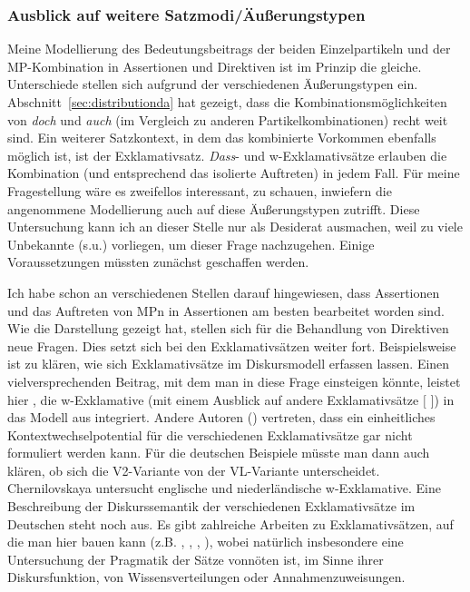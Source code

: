 {\subsubsection{Ausblick auf weitere Satzmodi/Äußerungstypen}
Meine Modellierung des Bedeutungsbeitrags der beiden Einzelpartikeln und der MP-Kombination in Assertionen  und Direktiven  ist im Prinzip die gleiche. Unterschiede stellen sich aufgrund der verschiedenen Äußerungstypen ein. Abschnitt~\ref{sec:distributionda} hat gezeigt, dass die Kombinationsmöglichkeiten von \textit{doch} und \textit{auch} (im Vergleich zu anderen Partikelkombinationen) recht weit sind. Ein weiterer Satzkontext, in dem das kombinierte Vorkommen ebenfalls möglich ist, ist der  Exklamativsatz. \textit{Dass}- und w-Exklamativsätze   erlauben die Kombination (und entsprechend das isolierte Auftreten) in jedem Fall. Für meine Fragestellung wäre es zweifellos interessant, zu schauen, inwiefern die angenommene Modellierung auch auf diese Äußerungstypen zutrifft. Diese Untersuchung kann ich an dieser Stelle nur als Desiderat ausmachen, weil zu viele Unbekannte (s.u.) vorliegen, um dieser Frage nachzugehen. Einige Voraussetzungen müssten zunächst geschaffen werden. 

Ich habe schon an verschiedenen Stellen darauf hingewiesen, dass Assertionen und das Auftreten von MPn in Assertionen am besten bearbeitet worden sind. Wie die Darstellung gezeigt hat, stellen sich für die Behandlung von Direktiven neue Fragen. Dies setzt sich bei den Exklamativsätzen weiter fort. Beispiels\-weise ist zu klären, wie sich Exklamativsätze im Diskursmodell erfassen lassen. Einen vielversprechenden Beitrag, mit dem man in diese Frage einsteigen könn\-te, leistet hier \citet{Chernilovskaya2014}, die w-Exklamative (mit einem Ausblick auf andere Exklamativsätze $[$\citeyear[131]{Chernilovskaya2014} $]$) in das Modell aus \citet{Farkas2010} integriert. Andere Autoren (\citealt{CastroviejoMiro2008}) vertreten, dass ein einheitliches Kontextwechselpotential für die verschiedenen Exklamativsätze gar nicht formuliert werden kann. Für die deutschen Beispiele müsste man dann auch klären, ob sich die V2-Variante von der VL-Variante unterscheidet. Chernilovskaya untersucht englische und niederländische w-Exklamative. Eine Beschreibung der Diskurssemantik der verschiedenen Exklamativsätze im Deutschen steht noch aus. Es gibt zahlreiche Arbeiten zu Exklamativsätzen, auf die man hier bauen kann (z.B. \citealt{Roncador1977}, \citealt{Zaefferer1983}, \citealt{Rosengren1992}, \citealt{Avis2001}), wobei natürlich insbesondere eine Untersuchung der Pragmatik der Sätze vonnöten ist, im Sinne ihrer Diskursfunktion, von Wissensverteilungen oder Annahmenzuweisungen. 

}
